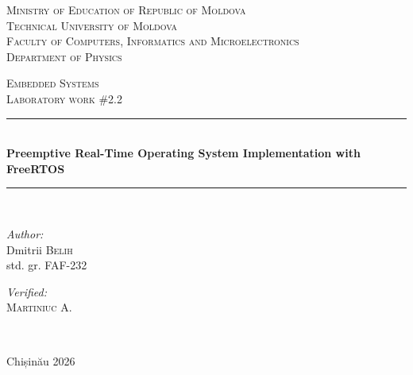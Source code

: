 \documentclass[12pt]{article}
\begin{document}
\begin{titlepage}
	\thispagestyle{empty}
	
	\begin{center}
		\textsc{\large Ministry of Education of Republic of Moldova}\\[0.5cm]
		\textsc{\large Technical University of Moldova}\\[0.5cm]
		\textsc{\large Faculty of Computers, Informatics and Microelectronics}\\[0.5cm]
		\textsc{\large Department of Physics}\\[1.2cm]
	\end{center}

	\vspace{25 mm}

	\begin{center}
		\textsc{\Large Embedded Systems}\\[0.5cm]
		\textsc{\large Laboratory work \#2.2}\\[0.5cm]

		\newcommand{\HRule}{\rule{\linewidth}{0.5mm}}
		\vspace{10 mm}
		\HRule \\[0.4cm]
		{ \LARGE \bfseries Preemptive Real-Time Operating System Implementation with FreeRTOS}\\[0.4cm]
		\HRule \\[1.5cm]
	\end{center}

	\vspace{10mm}

	\begin{minipage}[t]{0.4\textwidth}
		\begin{flushleft} \large
			\emph{Author:} \\
			Dmitrii \textsc{Belih}\\
			std. gr. FAF-232
		\end{flushleft}
	\end{minipage}
	\hfill
	\begin{minipage}[t]{0.4\textwidth}
		\begin{flushright} \large
			\emph{Verified:} \\
			\textsc{Martiniuc} A.\\
		\end{flushright}
	\end{minipage}\\[3cm]

	\vspace{5 mm}
	\begin{center}
		\large Chișinău 2026\\[0.5cm]
	\end{center}

	\vfill
\end{titlepage}
\end{document}
